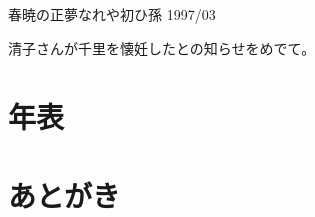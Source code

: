 \documentclass[b5paper]{tbook}
\begin{document}
\begin{shiika}春暁の正夢なれや初ひ孫 1997/03\end{shiika}

清子さんが千里を懐妊したとの知らせをめでて。

\chapter{年表}




\chapter*{あとがき}



%
\end{document}
